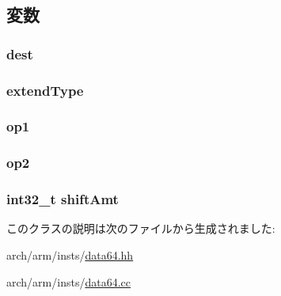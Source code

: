 \subsection{変数}
\hypertarget{classArmISA_1_1DataXERegOp_aec72e8e45bdc87abeeeb75d2a8a9a716}{
\subsubsection[{dest}]{ {\bf dest}}}
\label{classArmISA_1_1DataXERegOp_aec72e8e45bdc87abeeeb75d2a8a9a716}
\hypertarget{classArmISA_1_1DataXERegOp_adfa062f20232570cb00f2404d6243086}{
\subsubsection[{extendType}]{ {\bf extendType}}}
\label{classArmISA_1_1DataXERegOp_adfa062f20232570cb00f2404d6243086}
\hypertarget{classArmISA_1_1DataXERegOp_a4c465c43ad568f8bcf8ae71480e9cfea}{
\subsubsection[{op1}]{ {\bf op1}}}
\label{classArmISA_1_1DataXERegOp_a4c465c43ad568f8bcf8ae71480e9cfea}
\hypertarget{classArmISA_1_1DataXERegOp_a7799ff6cbe5a252199059eb8665820e7}{
\subsubsection[{op2}]{ {\bf op2}}}
\label{classArmISA_1_1DataXERegOp_a7799ff6cbe5a252199059eb8665820e7}
\hypertarget{classArmISA_1_1DataXERegOp_a378dfadeb317c390962c147be928d92d}{
\subsubsection[{shiftAmt}]{\setlength{\rightskip}{0pt plus 5cm}int32\_\-t {\bf shiftAmt}}}
\label{classArmISA_1_1DataXERegOp_a378dfadeb317c390962c147be928d92d}


このクラスの説明は次のファイルから生成されました:\begin{DoxyCompactItemize}
\item 
arch/arm/insts/\hyperlink{data64_8hh}{data64.hh}\item 
arch/arm/insts/\hyperlink{data64_8cc}{data64.cc}\end{DoxyCompactItemize}
